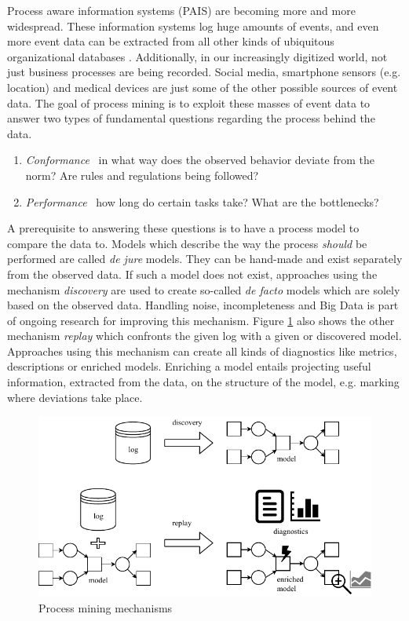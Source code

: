 Process aware information systems (PAIS) are becoming more and more widespread. These information systems log huge amounts of events, and even more event data can be extracted from all other kinds of ubiquitous organizational databases \cite{van2015extracting}.
Additionally, in our increasingly digitized world, not just business processes are being recorded. Social media, smartphone sensors (e.g. location) and medical devices are just some of the other possible sources of event data.
The goal of process mining is to exploit these masses of event data to answer two types of fundamental questions regarding the process behind the data.
\begin{enumerate}
    \item \emph{Conformance} \textemdash \ in what way does the observed behavior deviate from the norm? Are rules and regulations being followed?
    \item \emph{Performance} \textemdash \ how long do certain tasks take? What are the bottlenecks?
\end{enumerate}
A prerequisite to answering these questions is to have a process model to compare the data to.
Models which describe the way the process \emph{should} be performed are called \emph{de jure} models. They can be hand-made and exist separately from the observed data. If such a model does not exist, approaches using the mechanism \emph{discovery} are used to create so-called \emph{de facto} models which are solely based on the observed data.
Handling noise, incompleteness and Big Data is part of ongoing research for improving this mechanism.
Figure \ref{fig:procapproaches} also shows the other mechanism \emph{replay} which confronts the given log with a given or discovered model. Approaches using this mechanism can create all kinds of diagnostics like metrics, descriptions or enriched models. Enriching a model entails projecting useful information, extracted from the data, on the structure of the model, e.g. marking where deviations take place.
\begin{figure}
    \centering
    \includegraphics{figures/introduction/activities_schematic.pdf}
    \caption{Process mining mechanisms}
    \label{fig:procapproaches}
\end{figure}

